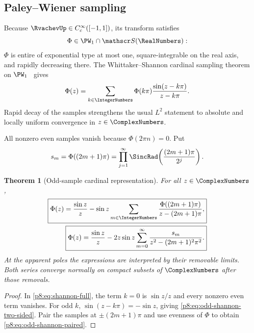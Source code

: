 \documentclass[11pt]{article}
\newtheorem{theorem}{Theorem}[section]
\theoremstyle{definition}
\theoremstyle{remark}
\begin{document}
\subsection{Paley--Wiener sampling}

Because $\RvachevUp\in C_c^\infty([-1,1])$, its transform satisfies
\begin{equation}
 \Phi\in\PW_1\cap\mathscr S(\RealNumbers):                        \label{p8:eq:Phi-PW}
\end{equation}
$\Phi$ is entire of exponential type at most one, square-integrable on the
real axis, and rapidly decreasing there.  The Whittaker--Shannon cardinal sampling theorem on
$\PW_1$~\cite{p8:paleywiener1934,p8:whittaker1935,p8:shannon1949} gives
\begin{equation}
 \Phi(z)=\sum_{k\in\IntegerNumbers}\Phi(k\pi)
 \frac{\sin(z-k\pi)}{z-k\pi}.                            \label{p8:eq:shannon-full}
\end{equation}
Rapid decay of the samples strengthens the usual $L^2$ statement to absolute
and locally uniform convergence in $z\in\ComplexNumbers$.

All nonzero even samples vanish because $\Phi(2\pi n)=0$.  Put
\begin{equation}
 s_m=\Phi((2m+1)\pi)
 =\prod_{j=1}^\infty
   \SincRad\!\left(\frac{(2m+1)\pi}{2^j}\right).           \label{p8:eq:odd-samples}
\end{equation}

\begin{theorem}[Odd-sample cardinal representation]
\label{p8:thm:odd-shannon}
For all $z\in\ComplexNumbers$,
\begin{align}
 \boxed{\displaystyle
 \Phi(z)=\frac{\sin z}{z}
 -\sin z\sum_{m\in\IntegerNumbers}
 \frac{\Phi((2m+1)\pi)}{z-(2m+1)\pi},}                 \label{p8:eq:odd-shannon-two-sided}\\
 \boxed{\displaystyle
 \Phi(z)=\frac{\sin z}{z}
 -2z\sin z\sum_{m=0}^\infty
 \frac{s_m}{z^2-(2m+1)^2\pi^2}.}                        \label{p8:eq:odd-shannon-paired}
\end{align}
At the apparent poles the expressions are interpreted by their removable
limits.  Both series converge normally on compact subsets of $\ComplexNumbers$ after those
removals.
\end{theorem}

\begin{proof}
In \eqref{p8:eq:shannon-full}, the term $k=0$ is $\sin z/z$ and every nonzero
even term vanishes.  For odd $k$,
$\sin(z-k\pi)=-\sin z$, giving
\eqref{p8:eq:odd-shannon-two-sided}.  Pair the samples at $\pm(2m+1)\pi$ and use
evenness of $\Phi$ to obtain \eqref{p8:eq:odd-shannon-paired}.
\end{proof}
\end{document}
